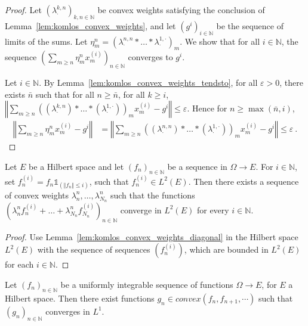 \begin{proof}
  \leanok
Let $(\lambda^{k,n}_\cdot)_{k, n \in \mathbb{N}}$ be convex weights satisfying the conclusion of Lemma~\ref{lem:komlos_convex_weights}, and let $(g^i)_{i\in \mathbb{N}}$ be the sequence of limits of the sums.
Let $\eta^n_m = (\lambda^{n,n}_\cdot * \ldots * \lambda^{1,\cdot}_\cdot)_m$.
We show that for all $i \in \mathbb{N}$, the sequence $\left(\sum_{m \ge n} \eta^n_m x_m^{(i)}\right)_{n \in \mathbb{N}}$ converges to $g^i$.

Let $i \in \mathbb{N}$.
By Lemma~\ref{lem:komlos_convex_weights_tendsto}, for all $\varepsilon > 0$, there exists $\bar{n}$ such that for all $n \ge \bar{n}$, for all $k \ge i$, $\left\Vert\sum_{m \ge n} \left((\lambda^{k,n}_\cdot) * \ldots * (\lambda^{1,\cdot}_\cdot)\right)_m x_m^{(i)} - g^i\right\Vert \le \varepsilon$.
Hence for $n \ge \max(\bar{n}, i)$,
\begin{align*}
  \left\Vert\sum_{m \ge n} \eta^n_m x_m^{(i)} - g^i\right\Vert
  &= \left\Vert\sum_{m \ge n} \left((\lambda^{n,n}_\cdot) * \ldots * (\lambda^{1,\cdot}_\cdot)\right)_m x_m^{(i)} - g^i\right\Vert
  \le \varepsilon
  \: .
\end{align*}
\end{proof}


\begin{lemma}\label{lem:komlos_convex_aux}
  \leanok
Let $E$ be a Hilbert space and let $(f_n)_{n \in \mathbb{N}}$ be a sequence in $\Omega \to E$.
For $i \in \mathbb{N}$, set $f_n^{(i)} = f_n \mathbb{1}_{(\Vert f_n \Vert \le i)}$, such that $f_n^{(i)} \in L^2(E)$.
Then there exists a sequence of convex weights $\lambda_n^{n}, \ldots, \lambda_{N_n}^{n}$ such that the functions
$\left(\lambda_n^{n} f_n^{(i)} + \ldots + \lambda_{N_n}^{n} f_{N_n}^{(i)} \right)_{n\in\mathbb{N}}$
converge in $L^2(E)$ for every $i \in \mathbb{N}$.
\end{lemma}

\begin{proof}
Use Lemma~\ref{lem:komlos_convex_weights_diagonal} in the Hilbert space $L^2(E)$ with the sequence of sequences $(f_n^{(i)})$, which are bounded in $L^2(E)$ for each $i \in \mathbb{N}$.
\end{proof}


\begin{lemma}\label{lem:komlos}
  \leanok
Let $(f_n)_{n\in\mathbb{N}}$ be a uniformly integrable sequence of functions $\Omega \to E$, for $E$ a Hilbert space.
Then there exist functions $g_n \in convex(f_n, f_{n+1}, \cdots)$ such that $(g_n)_{n\in\mathbb{N}}$ converges in $L^1$.
\end{lemma}

